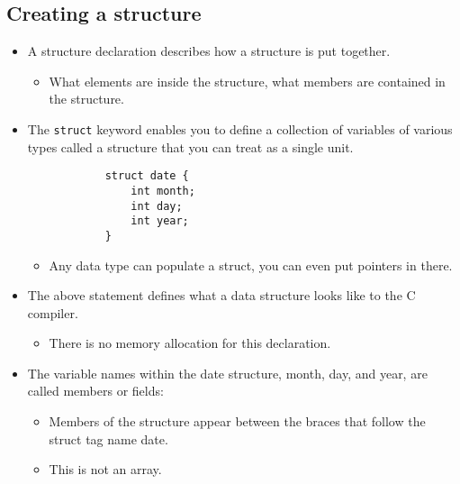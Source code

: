 \subsection{Creating a structure}
\begin{itemize}
    \item A structure declaration describes how a structure is put together.
        \begin{itemize}
            \item What elements are inside the structure, what members are contained in the structure. 
        \end{itemize}
    
    \item The \texttt{struct} keyword enables you to define a collection of variables of various types called a structure that you can treat as a single unit. 
        \begin{verbatim}
            struct date {
                int month;
                int day;
                int year;
            }
        \end{verbatim}
        \begin{itemize}
            \item Any data type can populate a struct, you can even put pointers in there. 
        \end{itemize}
    
    \item The above statement defines what a data structure looks like to the C compiler. 
        \begin{itemize}
            \item There is no memory allocation for this declaration. 
        \end{itemize}
    
    \item The variable names within the date structure, month, day, and year, are called members or fields:
        \begin{itemize}
            \item Members of the structure appear between the braces that follow the struct tag name date.
            \item This is not an array. 
        \end{itemize}
\end{itemize}

